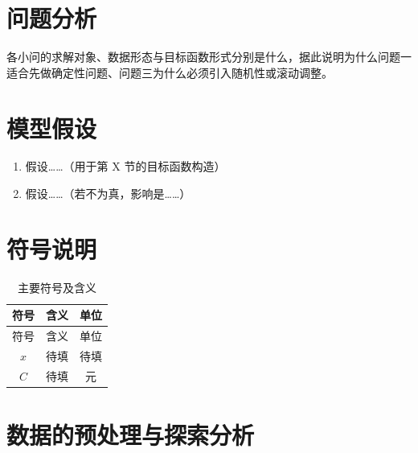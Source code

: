 \documentclass[12pt,a4paper,UTF8]{ctexart}
\begin{document}
\section{问题分析}

各小问的求解对象、数据形态与目标函数形式分别是什么，据此说明为什么问题一适合先做确定性问题、问题三为什么必须引入随机性或滚动调整。

\section{模型假设}
\begin{enumerate}[leftmargin=2em,itemsep=2pt]
  \item 假设……（用于第 X 节的目标函数构造）
  \item 假设……（若不为真，影响是……）
\end{enumerate}

\section{符号说明}
\begin{longtable}{clc}
  \caption{主要符号及含义} \\
  \toprule
  符号 & 含义 & 单位 \\
  \midrule
  \endfirsthead
  \toprule
  符号 & 含义 & 单位 \\
  \midrule
  \endhead
  $x$ & 待填 & 待填 \\
  $C$ & 待填 & 元 \\
  \bottomrule
\end{longtable}

\section{数据的预处理与探索分析}
\end{document}
